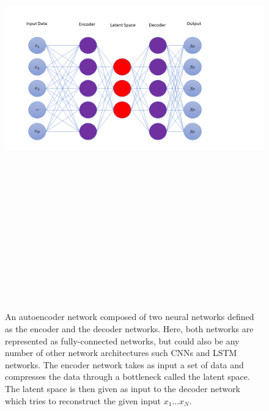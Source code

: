 \begin{figure}
    \centering
    \includegraphics[width=19cm,height=20cm,keepaspectratio]{figures/autoencoder_diagram.png}
    \caption[Simple autoencoder network illustration.]{An autoencoder network composed of two neural networks defined as the encoder 
    and the decoder networks. Here, both networks are represented as fully-connected networks, but could also be any number of other network architectures such \ac{CNN}s and \ac{LSTM} networks. The encoder network takes as input a set of data and compresses the data  
    through a bottleneck called the latent space. The latent space is then given as input to the decoder network which tries to reconstruct the given input $x_1 ... x_N$.}
    \label{fig:autoencoder_diagram}
\end{figure}

